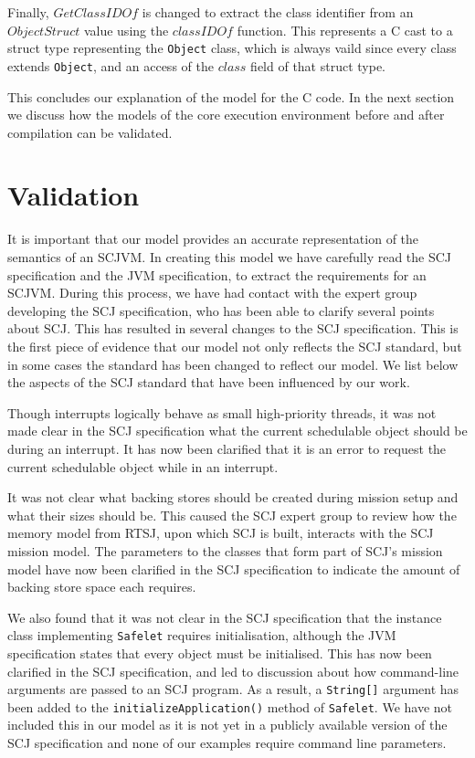 Finally, $GetClassIDOf$ is changed to extract the class identifier
from an $ObjectStruct$ value using the $classIDOf$ function.
This represents a C cast to a struct type representing the
\texttt{Object} class, which is always vaild since every class extends
\texttt{Object}, and an access of the $class$ field of that struct
type.

This concludes our explanation of the model for the C code. 
In the next section we discuss how the models of the core execution
environment before and after compilation can be validated.

\section{Validation}
\label{cee-validation-section}

It is important that our model provides an accurate representation of
the semantics of an SCJVM.
In creating this model we have carefully read the SCJ specification
and the JVM specification, to extract the requirements for an SCJVM.
During this process, we have had contact with the expert group
developing the SCJ specification, who has been able to clarify several
points about SCJ.
This has resulted in several changes to the SCJ specification.
This is the first piece of evidence that our model not only reflects
the SCJ standard, but in some cases the standard has been changed to
reflect our model. 
We list below the aspects of the SCJ standard that have been
influenced by our work. 

Though interrupts logically behave as small high-priority threads, it
was not made clear in the SCJ specification what the current
schedulable object should be during an interrupt.
It has now been clarified that it is an error to request the current
schedulable object while in an interrupt.

It was not clear what backing stores should be created during mission
setup and what their sizes should be.
This caused the SCJ expert group to review how the memory model from
RTSJ, upon which SCJ is built, interacts with the SCJ mission model.
The parameters to the classes that form part of SCJ's mission model
have now been clarified in the SCJ specification to indicate the
amount of backing store space each requires.

We also found that it was not clear in the SCJ specification that the
instance class implementing \texttt{Safelet} requires initialisation,
although the JVM specification states that every object must be
initialised.
This has now been clarified in the SCJ specification, and led to
discussion about how command-line arguments are passed to an SCJ
program. 
As a result, a \texttt{String[]} argument has been added to the
\texttt{initializeApplication()} method of \texttt{Safelet}.
We have not included this in our model as it is not yet in a publicly
available version of the SCJ specification and none of our examples
require command line parameters.

